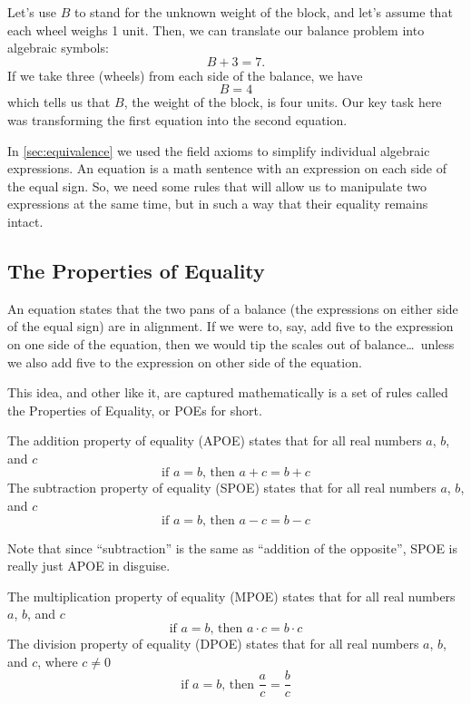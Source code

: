 Let's use $B$ to stand for the unknown weight of the block, and let's assume that each wheel weighs 1 unit. Then, we can translate our balance problem into algebraic symbols: \[B + 3 = 7.\] If we take three (wheels) from each side of the balance, we have \[B = 4\] which tells us that $B$, the weight of the block, is four units. Our key task here was transforming the first equation into the second equation.

In \cref{sec:equivalence} we used the field axioms to simplify individual algebraic expressions. An equation is a math sentence with an expression on each side of the equal sign. So, we need some rules that will allow us to manipulate two expressions at the same time, but in such a way that their equality remains intact.

\subsection{The Properties of Equality}

An equation states that the two pans of a balance (the expressions on either side of the equal sign) are in alignment. If we were to, say, add five to the expression on one side of the equation, then we would tip the scales out of balance\ldots\ unless we also add five to the expression on other side of the equation.

This idea, and other like it, are captured mathematically is a set of rules called the Properties of Equality, or POEs for short.

\begin{boxeddefex}
The \gls{addition property of equality} (APOE) states that for all real numbers $a$, $b$, and $c$ \[\text{if } a = b \text{, then } a + c = b + c\]
\tcblower
The \gls{subtraction property of equality} (SPOE) states that for all real numbers $a$, $b$, and $c$\[\text{if } a = b \text{, then } a - c = b - c\]
\end{boxeddefex}

Note that since ``subtraction'' is the same as ``addition of the opposite'', SPOE is really just APOE in disguise.

\begin{boxeddefex}
The \gls{multiplication property of equality} (MPOE) states that for all real numbers $a$, $b$, and $c$ \[\text{if } a = b \text{, then } a \cdot c = b \cdot c\]
\tcblower
The \gls{division property of equality} (DPOE) states that for all real numbers $a$, $b$, and $c$, where $c\neq 0$ \[\text{if } a = b \text{, then } \frac{a}{c} = \frac{b}{c}\]
\end{boxeddefex}

